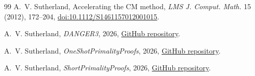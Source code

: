 \documentclass[11pt]{amsart}
\begin{document}
\begin{thebibliography}{99}
A.~V. Sutherland,
Accelerating the CM method,
\emph{LMS J. Comput. Math.} 15 (2012), 172--204,
\href{https://doi.org/10.1112/S1461157012001015}{doi:10.1112/S1461157012001015}.

A.~V. Sutherland,
\emph{DANGER3}, 2026,
\href{https://github.com/AndrewVSutherland/DANGER3}{GitHub repository}.

A.~V. Sutherland,
\emph{OneShotPrimalityProofs}, 2026,
\href{https://github.com/AndrewVSutherland/OneShotPrimalityProofs}{GitHub repository}.

A.~V. Sutherland,
\emph{ShortPrimalityProofs}, 2026,
\href{https://github.com/AndrewVSutherland/ShortPrimalityProofs}{GitHub repository}.

\end{thebibliography}
\end{document}
